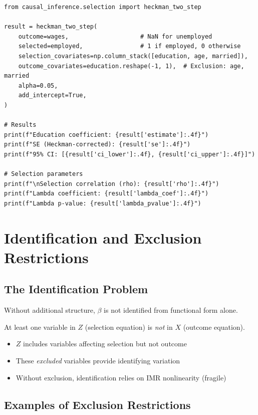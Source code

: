\begin{verbatim}
from causal_inference.selection import heckman_two_step

result = heckman_two_step(
    outcome=wages,                    # NaN for unemployed
    selected=employed,                # 1 if employed, 0 otherwise
    selection_covariates=np.column_stack([education, age, married]),
    outcome_covariates=education.reshape(-1, 1),  # Exclusion: age, married
    alpha=0.05,
    add_intercept=True,
)

# Results
print(f"Education coefficient: {result['estimate']:.4f}")
print(f"SE (Heckman-corrected): {result['se']:.4f}")
print(f"95% CI: [{result['ci_lower']:.4f}, {result['ci_upper']:.4f}]")

# Selection parameters
print(f"\nSelection correlation (rho): {result['rho']:.4f}")
print(f"Lambda coefficient: {result['lambda_coef']:.4f}")
print(f"Lambda p-value: {result['lambda_pvalue']:.4f}")
\end{verbatim}


\section{Identification and Exclusion Restrictions}

\subsection{The Identification Problem}

Without additional structure, $\beta$ is not identified from functional form alone.

\begin{assumption}
At least one variable in $Z$ (selection equation) is \textit{not} in $X$ (outcome equation).
\end{assumption}

\begin{itemize}
\item $Z$ includes variables affecting selection but not outcome
\item These \textit{excluded} variables provide identifying variation
\item Without exclusion, identification relies on IMR nonlinearity (fragile)
\end{itemize}

\subsection{Examples of Exclusion Restrictions}

